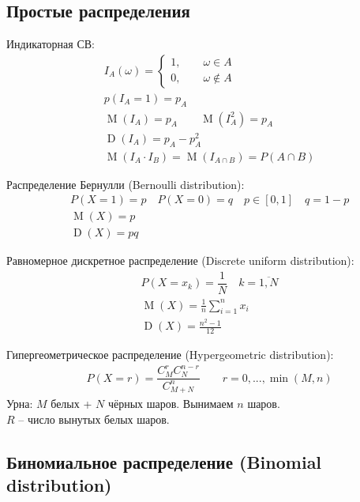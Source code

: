 \documentclass[a4paper,12pt,fleqn]{article}
\newenvironment{onsamepage} {\begin{minipage}{\textwidth}} {\end{minipage}}
\numberwithin{figure}{section}
\theoremstyle{definition}
\DeclareMathOperator{\M}{M}
\DeclareMathOperator{\D}{D}
\begin{document}
\subsection{Простые распределения}


Индикаторная СВ:
\begin{align*}
&	I_A(\omega) = \begin{cases*}
			1, \qquad \omega \in A	\\
			0, \qquad \omega \notin A
		\end{cases*}	\\
&	p(I_A=1) = p_A		\\
&	\M(I_A) = p_A	\qquad	\M(I_A^2) = p_A  \\
&	\D(I_A) = p_A - p_A^2	\\
&	\M(I_A \cdot I_B) = \M(I_{A \cap B}) = P(A \cap B)
\end{align*}

Распределение Бернулли (Bernoulli distribution):
\begin{align*}
&	P(X=1)=p \quad P(X=0)=q \quad p\in[0,1] \quad q=1-p \\
&	\M(X) = p \\
&	\D(X) = pq
\end{align*}

\medskip
Равномерное дискретное распределение (Discrete uniform distribution):
\begin{align*}
&	P(X=x_k)=\dfrac{1}{N} \quad k=\overline{1,N} \\
&	\M(X) = \frac{1}{n} \sum_{i=1}^n x_i \\
&	\D(X) = \frac{n^2-1}{12}
\end{align*}

\medskip
\begin{onsamepage}
Гипергеометрическое распределение (Hypergeometric distribution):
\begin{align*}
&	P(X=r) = \dfrac{C_M^r C_N^{n-r}}{C_{M+N}^n} \qquad r = 0,...,\min(M,n)
\end{align*}
Урна: $M$ белых + $N$ чёрных шаров. Вынимаем $n$ шаров. \\
	  $R$ -- число вынутых белых шаров.
\end{onsamepage}


\subsection{Биномиальное распределение (Binomial distribution)}
\end{document}
